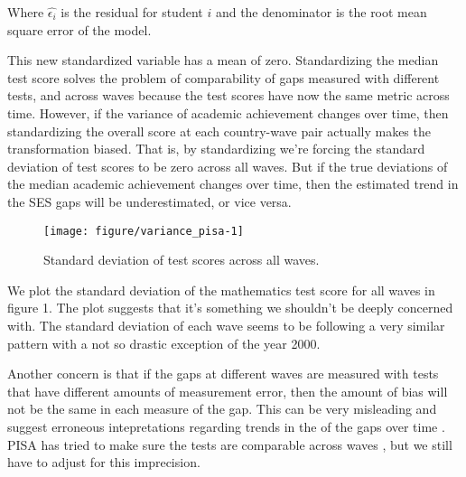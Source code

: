 \documentclass[11pt, a4paper]{article}\usepackage[]{graphicx}\usepackage[]{color}
\begin{document}

Where \begin{math}\hat{\epsilon_i}\end{math} is the residual for student \begin{math}i\end{math} and the denominator is the root mean square error of the model.

This new standardized variable has a mean of zero. Standardizing the median test score solves the problem of comparability of gaps measured with different tests, and across waves because the test scores have now the same metric across time. However, if the variance of academic achievement changes over time, then standardizing the overall score at each country-wave pair actually makes the transformation biased. That is, by standardizing we're forcing the standard deviation of test scores to be zero across all waves. But if the true deviations of the median academic achievement changes over time, then the estimated trend in the SES gaps will be underestimated, or vice versa.


\begin{figure}
\begin{center}


{\centering \texttt{[image: figure/variance\_pisa-1]} 

}



\caption{Standard deviation of test scores across all waves.}
\end{center}
\end{figure}

We plot the standard deviation of the mathematics test score for all waves in figure 1. The plot suggests that it's something we shouldn't be deeply concerned with. The standard deviation of each wave seems to be following a very similar pattern with a not so drastic exception of the year 2000.

Another concern is that if the gaps at different waves are measured with tests that have different amounts of measurement error, then the amount of bias will not be the same in each measure of the gap. This can be very misleading and suggest erroneous intepretations regarding trends in the of the gaps over time \citep{reardon2011}. PISA has tried to make sure the tests are comparable across waves \citep{pisa2012_technical}, but we still have to adjust for this imprecision.
\end{document}
